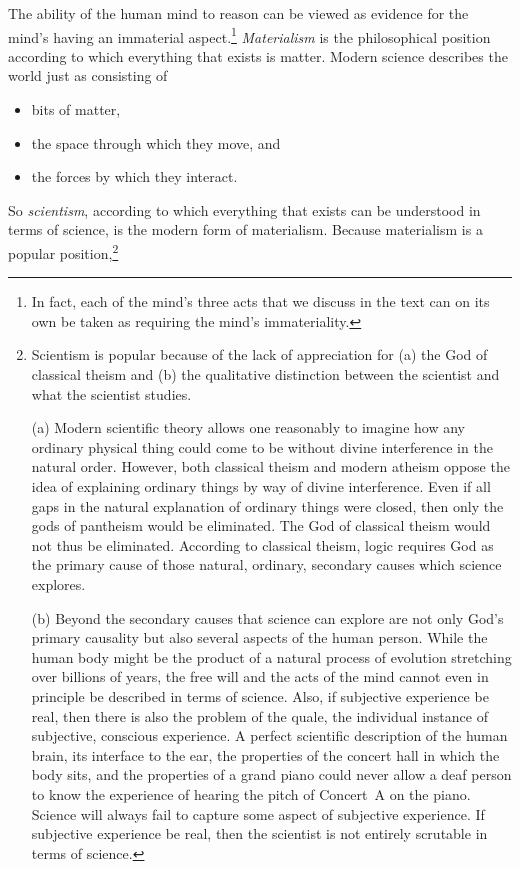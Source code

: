 The ability of the human mind to reason can be viewed as evidence for the
mind's having an immaterial aspect.\footnote{%
   In fact, each of the mind's three acts that we discuss in the text can on
   its own be taken as requiring the mind's immateriality.
}
\emph{Materialism} is the philosophical position according to which everything
that exists is matter.  Modern science describes the world just as consisting
of
\begin{itemize}
   \item bits of matter,
   \item the space through which they move, and
   \item the forces by which they interact.
\end{itemize}
So \emph{scientism}, according to which everything that exists can be
understood in terms of science, is the modern form of materialism.  Because
materialism is a popular position,\footnote{%
   Scientism is popular because of the lack of appreciation for (a) the God of
   classical theism and (b) the qualitative distinction between the scientist
   and what the scientist studies.

   (a) Modern scientific theory allows one reasonably to imagine how any
   ordinary physical thing could come to be without divine interference in the
   natural order. However, both classical theism and modern atheism oppose the
   idea of explaining ordinary things by way of divine interference.  Even if
   all gaps in the natural explanation of ordinary things were closed, then
   only the gods of pantheism would be eliminated. The God of classical theism
   would not thus be eliminated.  According to classical theism, logic requires
   God as the primary cause of those natural, ordinary, secondary causes which
   science explores.
   
   (b) Beyond the secondary causes that science can explore are not only God's
   primary causality but also several aspects of the human person. While the
   human body might be the product of a natural process of evolution stretching
   over billions of years, the free will and the acts of the mind cannot even
   in principle be described in terms of science. Also, if subjective
   experience be real, then there is also the problem of the quale, the
   individual instance of subjective, conscious experience.  A perfect
   scientific description of the human brain, its interface to the ear, the
   properties of the concert hall in which the body sits, and the properties of
   a grand piano could never allow a deaf person to know the experience of
   hearing the pitch of Concert~A on the piano.  Science will always fail to
   capture some aspect of subjective experience. If subjective experience be
   real, then the scientist is not entirely scrutable in terms of science.
}
